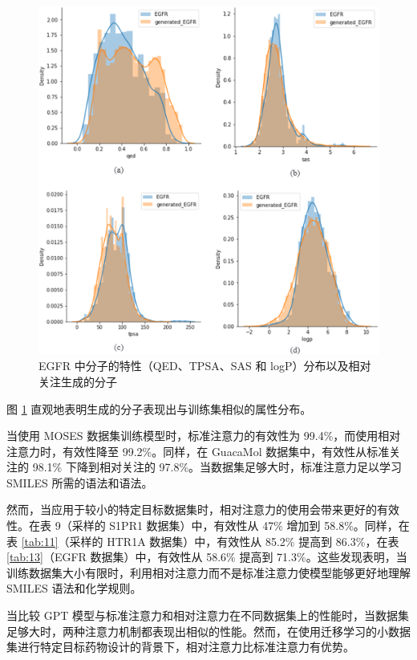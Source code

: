 \begin{translation}
\begin{figure}[H]
  \centering
  \includegraphics[width=\linewidth]{figures/9.png}
  \caption{EGFR 中分子的特性（QED、TPSA、SAS 和 logP）分布以及相对关注生成的分子}
  \label{fig:9}
\end{figure}

图 \ref{fig:9} 直观地表明生成的分子表现出与训练集相似的属性分布。

当使用 MOSES 数据集训练模型时，标准注意力的有效性为 99.4\%，而使用相对注意力时，有效性降至 99.2\%。同样，在 GuacaMol 数据集中，有效性从标准关注的 98.1\% 下降到相对关注的 97.8\%。当数据集足够大时，标准注意力足以学习 SMILES 所需的语法和语法。

然而，当应用于较小的特定目标数据集时，相对注意力的使用会带来更好的有效性。在表 9（采样的 S1PR1 数据集）中，有效性从 47\% 增加到 58.8\%。同样，在表 \ref{tab:11}（采样的 HTR1A 数据集）中，有效性从 85.2\% 提高到 86.3\%，在表 \ref{tab:13}（EGFR 数据集）中，有效性从 58.6\% 提高到 71.3\%。这些发现表明，当训练数据集大小有限时，利用相对注意力而不是标准注意力使模型能够更好地理解 SMILES 语法和化学规则。

当比较 GPT 模型与标准注意力和相对注意力在不同数据集上的性能时，当数据集足够大时，两种注意力机制都表现出相似的性能。然而，在使用迁移学习的小数据集进行特定目标药物设计的背景下，相对注意力比标准注意力有优势。


\end{translation}
